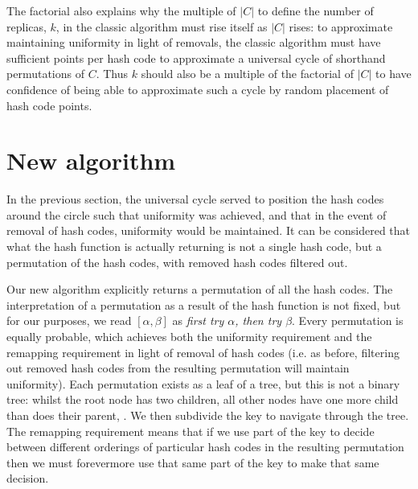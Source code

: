 \documentclass[runningheads,a4paper]{llncs}
\begin{document}
The factorial also explains why the multiple of $|C|$ to define the
number of replicas, $k$, in the classic algorithm must rise itself as
$|C|$ rises: to approximate maintaining uniformity in light of
removals, the classic algorithm must have sufficient points per hash
code to approximate a universal cycle of shorthand permutations of
$C$. Thus $k$ should also be a multiple of the factorial of $|C|$ to
have confidence of being able to approximate such a cycle by random
placement of hash code points.


\section{New algorithm}

In the previous section, the universal cycle served to position the
hash codes around the circle such that uniformity was achieved, and
that in the event of removal of hash codes, uniformity would be
maintained. It can be considered that what the hash function is
actually returning is not a single hash code, but a permutation of the
hash codes, with removed hash codes filtered out.

Our new algorithm explicitly returns a permutation of all the hash
codes. The interpretation of a permutation as a result of the hash
function is not fixed, but for our purposes, we read $[\alpha,\beta]$
as {\em first try $\alpha$, then try $\beta$}. Every permutation is
equally probable, which achieves both the uniformity requirement and
the remapping requirement in light of removal of hash codes (i.e. as
before, filtering out removed hash codes from the resulting
permutation will maintain uniformity). Each permutation exists as a
leaf of a tree, but this is not a binary tree: whilst the root node
has two children, all other nodes have one more child than does their
parent, . We then subdivide the key to navigate
through the tree. The remapping requirement means that if we use part
of the key to decide between different orderings of particular hash
codes in the resulting permutation then we must forevermore use that
same part of the key to make that same decision.
\end{document}

